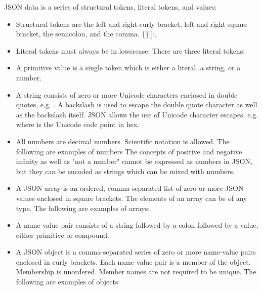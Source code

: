 JSON data is a series of structural tokens, literal tokens, and values:
\begin{itemize}
\item Structural tokens are the left and right curly bracket, left and right square bracket, the semicolon, and the comma. \{\}[]:,
\item Literal tokens must always be in lowercase. There are three literal tokens:   
\item A primitive value is a single token which is either a literal, a string, or a number.
\item A string consists of zero or more Unicode characters enclosed in
  double quotes, e.g. .  A backslash is used to escape the double quote
  character as well as the backslash itself. JSON allows the use of
  Unicode character escapes, e.g. \code{\\uHHHH}  where  is
  the Unicode code point in hex.
\item All numbers are decimal numbers. Scientific notation is
  allowed. The following are examples of numbers    The concepts of positive and negative infinity as well as
  "not a number" cannot be expressed as numbers in JSON, but they can
  be encoded as strings which can be mixed with numbers.
\item A JSON array is an ordered, comma-separated list of zero or more
  JSON values enclosed in square brackets. The elements of an array
  can be of any type.  The following are examples of arrays: \code{[] [ 1 ] [ "a" , "b", true ]}
\item A name-value pair consists of a string followed by a colon followed by a value, either primitive or compound.
\item A JSON object is a comma-separated series of zero or more
  name-value pairs enclosed in curly brackets. Each name-value pair is
  a member of the object. Membership is unordered. Member names are
  not required to be unique.  The following are examples of objects:
\end{itemize}


